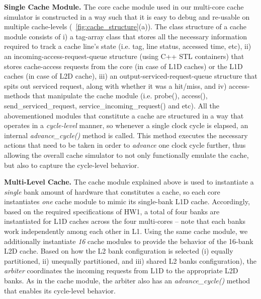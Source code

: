 \documentclass[12pt]{report}
\newcommand{\Fig}[1]{\figurename~\ref{#1}}
\begin{document}
\textbf{Single Cache Module.} The core cache module used in our multi-core cache simulator is constructed in a way such that it is easy to debug and re-usable on multiple 
cache-levels (\Fig{fig:cache_structure}(a)). The class structure of a cache module consists of i) a tag-array
class that stores all the necessary information required to track a cache line's state (i.e. tag, line status, accessed time, etc), 
ii) an incoming-access-request-queue structure (using C++ STL containers) that stores cache-access requests from the core (in case of L1D caches) or
the L1D caches (in case of L2D cache), iii) an output-serviced-request-queue structure that spits out serviced request, along with whether
it was a hit/miss, and iv) access-methods that manipulate the cache module (i.e. probe(), access(), send\_serviced\_request, service\_incoming\_request()
and etc). All the abovementioned modules that constitute a cache are structured in a way that operates in a \emph{cycle-level} manner, 
so whenever a single clock cycle is elapsed, an internal \emph{advance\_cycle()} method is called. This method executes the necessary actions that
need to be taken in order to \emph{advance} one clock cycle further, thus allowing the overall cache simulator to not only functionally
emulate the cache, but also to capture the cycle-level behavior. 

\textbf{Multi-Level Cache.} The cache module explained above is used to instantiate a \emph{single} bank amount of hardware that constitutes a cache, so each core instantiates
\emph{one} cache module to mimic its single-bank L1D cache. Accordingly, based on the required specifications of HW1, a total of four banks
are instantiated for L1D caches across the four multi-cores -- note that each banks work independently among each other in L1. Using the same 
cache module, we additionally instantiate \emph{16} cache modules to provide the behavior of the 16-bank L2D cache. Based on how the L2 bank
configuration is selected (i) equally partitioned, ii) unequally partitioned, and iii) shared L2 banks configuration), the \emph{arbiter} coordinates the incoming requests
from L1D to the appropriate L2D banks. As in the cache module, the arbiter also has an \emph{advance\_cycle()} method that enables its cycle-level
behavior.
\end{document}
